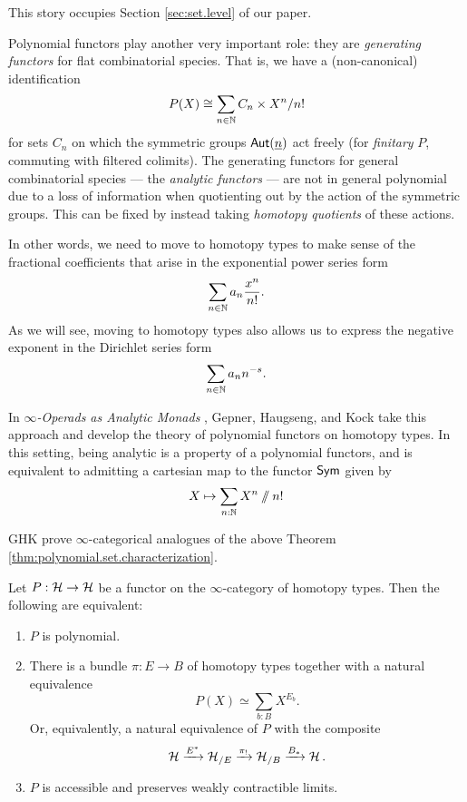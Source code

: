 This story occupies Section \ref{sec:set.level} of our paper.

Polynomial functors play another very important role: they are \emph{generating
  functors} for flat combinatorial species. That is, we have a (non-canonical)
identification
$$P(X) \cong \sum_{n \in \operatorname{\mathbb{N}}} C_n \times X^n/n!$$
for sets $C_n$ on which the symmetric groups $\operatorname{\mathsf{Aut}}(\underline{n})$ act freely
(for \emph{finitary} $P$, commuting with filtered colimits).
The generating functors for general combinatorial species --- the \emph{analytic
functors} --- are not in general polynomial due to a loss of information when
quotienting out by the action of the symmetric groups. This can be fixed by
instead taking \emph{homotopy quotients} of these actions.

In other words, we need to move to homotopy types to make sense of the
fractional coefficients that arise in the exponential power series form
$$\sum_{n \in \operatorname{\mathbb{N}}} a_n \frac{x^n}{n!}.$$
As we will see, moving to homotopy types also allows us to express the negative
exponent in the Dirichlet series form
$$\sum_{n \in \operatorname{\mathbb{N}}} a_n n^{-s}.$$

In \emph{$\infty$-Operads as Analytic Monads} \cite{GHK:Analytic.Monads},
Gepner, Haugseng, and Kock take this approach and develop the theory of
polynomial functors on homotopy types. In this setting, being analytic is a
property of a polynomial functors, and is equivalent to admitting a cartesian
map to the functor $\mathsf{{Sym}}$ given by
$$X \mapsto \sum_{n : \operatorname{\mathbb{N}}} X^n \mathbin{/\mkern-6mu/} n!$$

GHK prove $\infty$-categorical analogues of the above Theorem
\ref{thm:polynomial.set.characterization}.
\begin{thm}\label{thm:polynomial.type.characterization}
Let $P : \operatorname{\mathcal{H}} \to \operatorname{\mathcal{H}}$ be a functor on the $\infty$-category of homotopy types.
Then the following are equivalent:
  \begin{enumerate}
  \item $P$ is polynomial.
  \item There is a bundle $\pi : E \to B$ of homotopy types together with a natural equivalence
    $$P(X) \simeq \sum_{b : B} X^{E_b}.$$
    Or, equivalently, a natural equivalence of $P$ with the composite
    $$\operatorname{\mathcal{H}} \xrightarrow{E^{\ast}} \operatorname{\mathcal{H}}_{/E} \xrightarrow{\pi_!} \operatorname{\mathcal{H}}_{/B} \xrightarrow{B_\ast} \operatorname{\mathcal{H}}.$$
  \item $P$ is accessible and preserves weakly contractible limits.
  \end{enumerate}
\end{thm}

